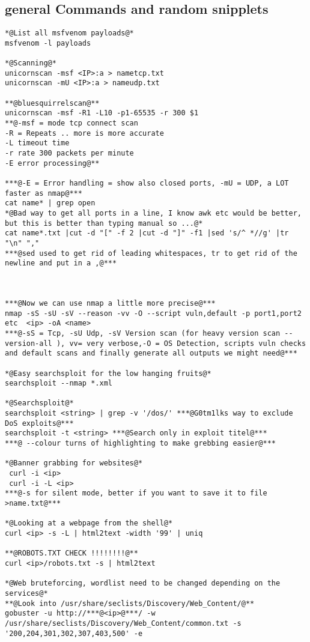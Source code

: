 \documentclass[a4paper,12pt, twoside,]{report}
\begin{document}
\subsection{general Commands and random snipplets}
\begin{lstlisting}[caption={commands},label=com]
*@List all msfvenom payloads@*
msfvenom -l payloads

*@Scanning@*
unicornscan -msf <IP>:a > nametcp.txt
unicornscan -mU <IP>:a > nameudp.txt

**@bluesquirrelscan@**
unicornscan -msf -R1 -L10 -p1-65535 -r 300 $1 
**@-msf = mode tcp connect scan
-R = Repeats .. more is more accurate
-L timeout time
-r rate 300 packets per minute
-E error processing@**

***@-E = Error handling = show also closed ports, -mU = UDP, a LOT faster as nmap@***
cat name* | grep open
*@Bad way to get all ports in a line, I know awk etc would be better, but this is better than typing manual so ...@*
cat name*.txt |cut -d "[" -f 2 |cut -d "]" -f1 |sed 's/^ *//g' |tr "\n" ","
***@sed used to get rid of leading whitespaces, tr to get rid of the newline and put in a ,@***



***@Now we can use nmap a little more precise@***
nmap -sS -sU -sV --reason -vv -O --script vuln,default -p port1,port2 etc  <ip> -oA <name>
***@-sS = Tcp, -sU Udp, -sV Version scan (for heavy version scan --version-all ), vv= very verbose,-O = OS Detection, scripts vuln checks and default scans and finally generate all outputs we might need@***

*@Easy searchsploit for the low hanging fruits@*
searchsploit --nmap *.xml

*@Searchsploit@*
searchsploit <string> | grep -v '/dos/' ***@G0tm1lks way to exclude DoS exploits@***
searchsploit -t <string> ***@Search only in exploit titel@***
***@ --colour turns of highlighting to make grebbing easier@***

*@Banner grabbing for websites@*
 curl -i <ip>
 curl -i -L <ip>
***@-s for silent mode, better if you want to save it to file >name.txt@***

*@Looking at a webpage from the shell@*
curl <ip> -s -L | html2text -width '99' | uniq

**@ROBOTS.TXT CHECK !!!!!!!!@**
curl <ip>/robots.txt -s | html2text

*@Web bruteforcing, wordlist need to be changed depending on the services@* 
**@Look into /usr/share/seclists/Discovery/Web_Content/@**
gobuster -u http://***@<ip>@***/ -w /usr/share/seclists/Discovery/Web_Content/common.txt -s '200,204,301,302,307,403,500' -e
                                                                                                                           

\end{lstlisting}
\end{document}
